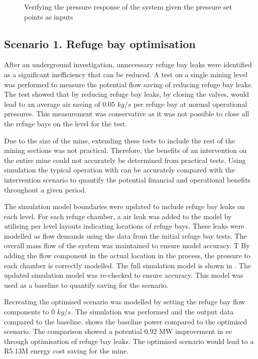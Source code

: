 	\begin{figure}[h!]
		\centering
		
		\caption{Verifying the pressure response of the system given the pressure set points as inputs}
		\label{fig: Verification Pressure kusasalethu Setpoint}
	\end{figure}

	\subsection{Scenario 1. Refuge bay optimisation}
	After an underground investigation, unnecessary refuge bay leaks were identified as a significant inefficiency that can be reduced. A test on a single mining level was performed to measure the potential flow saving of reducing refuge bay leaks. The test showed that by reducing refuge bay leaks, by closing the valves, would lead to an average air saving of $0.05$ $kg/s$ per refuge bay at normal operational pressures. This measurement was conservative as it was not possible to close all the refuge bays on the level for the test. 
	\par 
	Due to the size of the mine, extending these tests to include the rest of the mining sections was not practical.  Therefore,  the benefits of an intervention on the entire mine could not accurately be determined from practical tests. Using simulation the typical operation with can be accurately compared with the intervention scenario to quantify the potential financial and operational benefits throughout a given period.
	\par
	The simulation model boundaries were updated to include refuge bay leaks on each level. For each refuge chamber, a air leak was added to the model by utilising per level layouts indicating locations of refuge bays. These leaks were modelled as flow demands using the data from the initial refuge bay tests. The overall mass flow of the system was maintained to ensure model accuracy. T By adding the flow component in the actual location in the process, the pressure to each chamber is correctly modelled. The full simulation model is shown in . The updated simulation model was re-checked to ensure accuracy. This model was used as a baseline to quantify saving for the scenario.
	\par 
	Recreating the optimised scenario was modelled by setting the refuge bay flow components to 0 $kg/s$. The simulation was performed and the output data compared to the baseline.  shows the baseline power compared to the optimised scenario. The comparison showed a potential 0.92 MW improvement in \gls{ee} through optimisation of refuge bay leaks. The optimised scenario would lead to a R5.13M energy cost saving for the mine.
